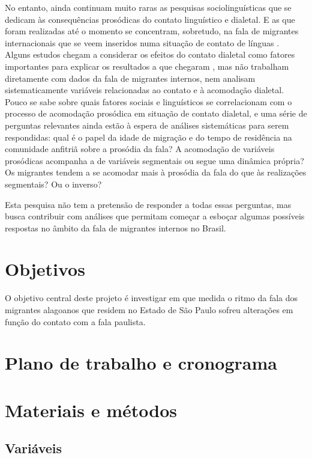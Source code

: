 \documentclass[
	a4paper,	%
	12pt,		%
	]{article}	%
\begin{document}
	No entanto, ainda continuam muito raras as pesquisas sociolinguísticas que se dedicam às
	consequências prosódicas do contato linguístico e dialetal. E as que foram realizadas até o
	momento se concentram, sobretudo, na fala de migrantes internacionais que se veem inseridos numa
	situação de contato de línguas \citep{Carter2005}. Alguns estudos chegam a considerar os efeitos
	do contato dialetal como fatores importantes para explicar os resultados a que chegaram
	\citep{Torgersen.Szakay2012, Fagyal2010}, mas não trabalham diretamente com dados da fala de
	migrantes internos, nem analisam sistematicamente variáveis relacionadas ao contato e à
	acomodação dialetal. Pouco se sabe sobre quais fatores sociais e linguísticos se correlacionam
	com o processo de acomodação prosódica em situação de contato dialetal, e uma série de perguntas
	relevantes ainda estão à espera de análises sistemáticas para serem respondidas: qual é o papel
	da idade de migração e do tempo de residência na comunidade anfitriã sobre a prosódia da fala? A
	acomodação de variáveis prosódicas acompanha a de variáveis segmentais ou segue uma dinâmica
	própria? Os migrantes tendem a se acomodar mais à prosódia da fala do que às realizações
	segmentais? Ou o inverso? 
	
	Esta pesquisa não tem a pretensão de responder a todas essas perguntas, mas busca contribuir com
	análises que permitam começar a esboçar algumas possíveis respostas no âmbito da fala de
	migrantes internos no Brasil.


\section{Objetivos} \label{objetivos}

O objetivo central deste projeto é investigar em que medida o ritmo da fala dos migrantes alagoanos
que residem no Estado de São Paulo sofreu alterações em função do contato com a fala paulista.

\section{Plano de trabalho e cronograma} \label{plano}
	
\section{Materiais e métodos} 
\label{metodo}

	\subsection{Variáveis} \label{variaveis}
\end{document}
